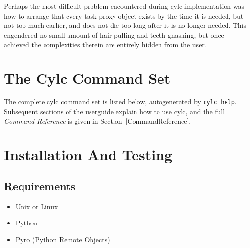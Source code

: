 \documentclass[11pt,a4paper]{article}
\begin{document}

Perhaps the most difficult problem encountered during cylc
implementation was how to arrange that every task proxy object exists by
the time it is needed, but not too much earlier, and does not die too
long after it is no longer needed. This engendered no small amount
of hair pulling and teeth gnashing, but once achieved the complexities
therein are entirely hidden from the user.




\pagebreak
\section{The Cylc Command Set}

The complete cylc command set is listed below, autogenerated by 
\lstinline=cylc help=. Subsequent sections of the userguide
explain how to use cylc, and the full {\em Command Reference} 
is given in Section~\ref{CommandReference}.

\lstset{language=usage}


\pagebreak
\section{Installation And Testing} 
\label{InstallationAndTesting}

\subsection{Requirements} 
\label{Requirements}

\begin{itemize}
    \item Unix or Linux
    \item Python
    \item Pyro (Python Remote Objects)
\end{itemize}
\end{document}
